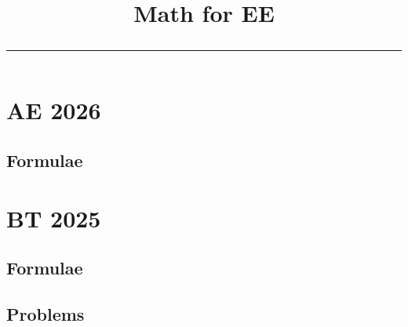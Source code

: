 \documentclass[journal]{IEEEtran}
\begin{document}

\onecolumn


\title{
	\begin{center}
	Math for EE
	\\
\rule{0.4\columnwidth}{0.4pt}
\end{center}
}

\tableofcontents

\newpage
\onecolumn


\renewcommand{\thetable}{\theenumi}

\section{AE 2026}
\subsection{Formulae}

\section{BT 2025}
\subsection{Formulae}

\newpage
\subsection{Problems}

\iffalse
\end{document}
